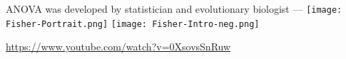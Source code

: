 \begin{frame}
\centering
ANOVA was developed by statistician and evolutionary biologist ---
\vfill
\texttt{[image: Fisher-Portrait.png]}
\texttt{[image: Fisher-Intro-neg.png]}
\end{frame}
\begin{frame}[fragile]
	\begin{center}
		\url{https://www.youtube.com/watch?v=0XsovsSnRuw}
	\end{center}
\end{frame}
